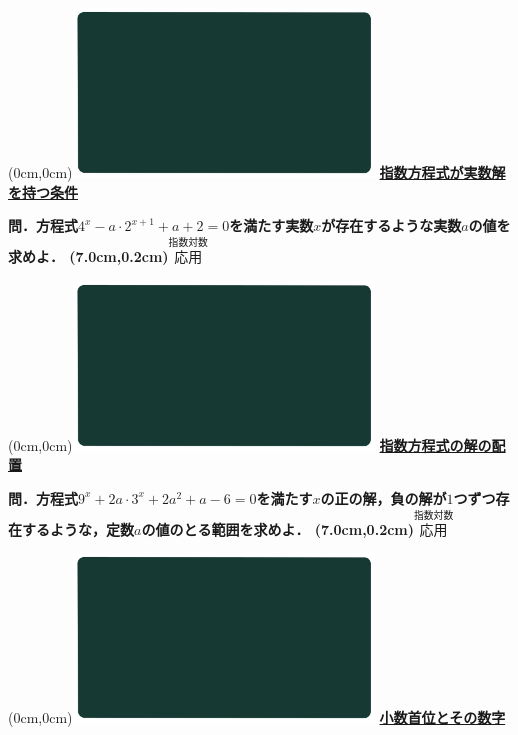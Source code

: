 \documentclass[10pt,
fleqn,
dvipdfmx,
uplatex
]{jsarticle}
\begin{document}
\newpage



\at(0cm,0cm){\includegraphics[width=8cm,bb=0 0 1920 1080]{./youtube/thumbnails/templates/smart_background/指数対数.jpeg}}
{\color{orange}\bf\boldmath\Large\underline{指数方程式が実数解を持つ条件}}\vspace{0.3zw}

\LARGE 
\bf\boldmath 問．方程式$4^x-a\cdot 2^{x+1}+a+2=0$を満たす実数$x$が存在するような実数$a$の値を求めよ．
\at(7.0cm,0.2cm){\small\color{bradorange}$\overset{\text{指数対数}}{\text{応用}}$}


\newpage



\at(0cm,0cm){\includegraphics[width=8cm,bb=0 0 1920 1080]{./youtube/thumbnails/templates/smart_background/指数対数.jpeg}}
{\color{orange}\bf\boldmath\LARGE\underline{指数方程式の解の配置}}\vspace{0.3zw}

\Large 
\bf\boldmath 問．方程式$9^x+2a\cdot 3^x+2a^2+a-6=0$を満たす$x$の正の解，負の解が$1$つずつ存在するような，定数$a$の値のとる範囲を求めよ．
\at(7.0cm,0.2cm){\small\color{bradorange}$\overset{\text{指数対数}}{\text{応用}}$}


\newpage



\at(0cm,0cm){\includegraphics[width=8cm,bb=0 0 1920 1080]{./youtube/thumbnails/templates/smart_background/指数対数.jpeg}}
{\color{orange}\bf\boldmath\LARGE\underline{小数首位とその数字}}\vspace{0.3zw}
\end{document}
